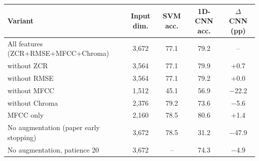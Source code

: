 \begin{tabular}{lcccc}
\toprule
Variant & Input dim. & SVM acc. & 1D-CNN acc. & $\Delta$ CNN (pp) \\
\midrule
All features (ZCR+RMSE+MFCC+Chroma) & 3{,}672 & 77.1 & 79.2 & -- \\
without ZCR & 3{,}564 & 77.1 & 79.9 & +0.7 \\
without RMSE & 3{,}564 & 77.1 & 79.2 & +0.0 \\
without MFCC & 1{,}512 & 45.1 & 56.9 & $-$22.2 \\
without Chroma & 2{,}376 & 79.2 & 73.6 & $-$5.6 \\
MFCC only & 2{,}160 & 78.5 & 80.6 & +1.4 \\
No augmentation (paper early stopping) & 3{,}672 & 78.5 & 31.2 & $-$47.9 \\
No augmentation, patience 20 & 3{,}672 & -- & 74.3 & $-$4.9 \\
\bottomrule
\end{tabular}
